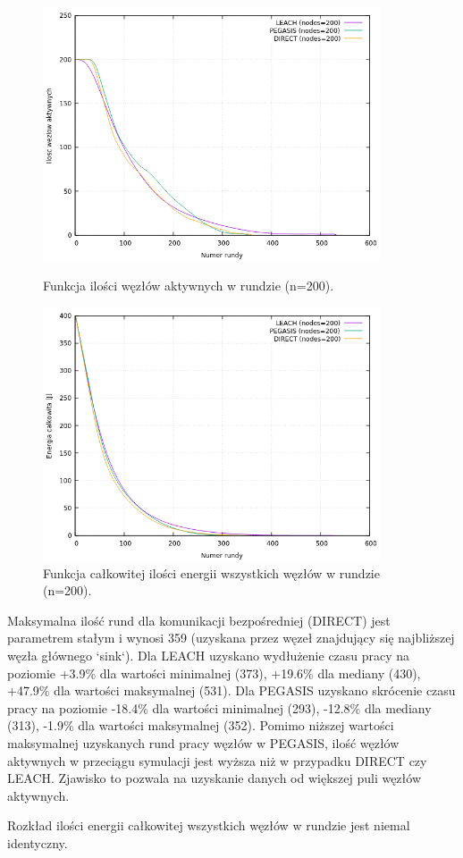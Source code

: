 \documentclass[a4paper,12pt,twoside,openany]{report}
\begin{document}
\begin{figure}[H]
 \centering
 \includegraphics[width=10cm]{images/gnuplot/test_2/nodes_in_round_200.png}
 \caption{Funkcja ilości węzłów aktywnych w rundzie (n=200).}
 \includegraphics[width=10cm]{images/gnuplot/test_2/energy_in_round_200.png}
 \caption{Funkcja całkowitej ilości energii wszystkich węzłów w rundzie (n=200).}
\end{figure}

\par
Maksymalna ilość rund dla komunikacji bezpośredniej (DIRECT) jest parametrem stałym i wynosi 359 (uzyskana przez węzeł znajdujący się najbliższej węzła głównego `sink`).
Dla LEACH uzyskano wydłużenie czasu pracy na poziomie +3.9\% dla wartości minimalnej (373), +19.6\% dla mediany (430), +47.9\% dla wartości maksymalnej (531).
Dla PEGASIS uzyskano skrócenie czasu pracy na poziomie -18.4\% dla wartości minimalnej (293), -12.8\% dla mediany (313), -1.9\% dla wartości maksymalnej (352).
Pomimo niższej wartości maksymalnej uzyskanych rund pracy węzłów w PEGASIS, ilość węzłów aktywnych w przeciągu symulacji jest wyższa niż w przypadku DIRECT czy LEACH.
Zjawisko to pozwala na uzyskanie danych od większej puli węzłów aktywnych.
\par
Rozkład ilości energii całkowitej wszystkich węzłów w rundzie jest niemal identyczny.
\end{document}
